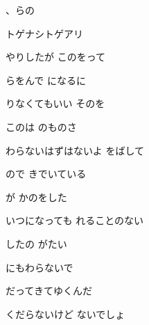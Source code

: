 \documentclass[a4paper,tate,twocolumn,12pt]{ltjtarticle}
\begin{document}
\thispagestyle{empty}

\begin{center}
{\LARGE {}、らの}

{\large トゲナシトゲアリ}
\end{center}

\vspace{1em}

\begin{flushleft}

\noindent\begin{minipage}{\linewidth}
やりしたが このをって

らをんで になるに

りなくてもいい そのを

このは のものさ
\end{minipage}

\vspace{2em}

\noindent\begin{minipage}{\linewidth}
わらないはずはないよ をばして
\end{minipage}

\vspace{2em}

\noindent\begin{minipage}{\linewidth}
ので きでいている

が かのをした

いつになっても れることのない

したの がたい
\end{minipage}

\vspace{2em}

\noindent\begin{minipage}{\linewidth}
にもわらないで

だってきてゆくんだ

くだらないけど ないでしょ


\end{minipage}
\end{flushleft}
\end{document}
